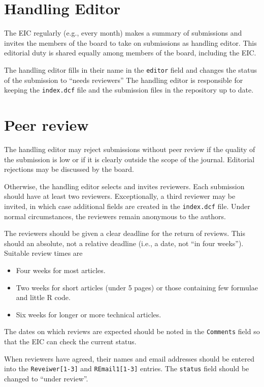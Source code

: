\documentclass[11pt]{article}
\begin{document}
\section{Handling Editor}

The EIC regularly (e.g., every month) makes a summary of submissions
and invites the members of the board to take on submissions as
handling editor. This editorial duty is shared equally among members
of the board, including the EIC.

The handling editor fills in their name in the \texttt{editor} field
and changes the status of the submission to ``needs reviewers'' The
handling editor is responsible for keeping the \texttt{index.dcf} file
and the submission files in the repository up to date.

\section{Peer review}

The handling editor may reject submissions without peer review if the
quality of the submission is low or if it is clearly outside the scope
of the journal. Editorial rejections may be discussed by the board.

Otherwise, the handling editor selects and invites reviewers. Each
submission should have at least two reviewers. Exceptionally, a third
reviewer may be invited, in which case additional fields are created
in the \texttt{index.dcf} file. Under normal circumstances, the
reviewers remain anonymous to the authors.

The reviewers should be given a clear deadline for the return of
reviews.  This should an absolute, not a relative deadline (i.e., a
date, not ``in four weeks''). Suitable review times are
\begin{itemize}
\item Four weeks for most articles.
\item Two weeks for short articles (under 5 pages) or those containing
few formulae and little R code.
\item Six weeks for longer or more technical articles.
\end{itemize}
The dates on which reviews are expected should be noted in the
\texttt{Comments} field so that the EIC can check the current status.

When reviewers have agreed, their names and email addresses should
be entered into the \verb+Reveiwer[1-3]+ and \verb+REmail1[1-3]+ entries.
The \texttt{status} field should be changed to ``under review''.
\end{document}
